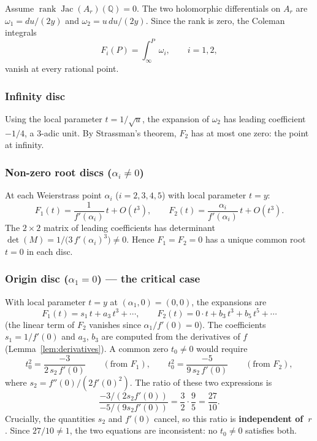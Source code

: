 \documentclass[11pt]{amsart}
\theoremstyle{plain}
\theoremstyle{definition}
\theoremstyle{remark}
\newcommand{\QQ}{\mathbb{Q}}
\newcommand{\Jac}{\operatorname{Jac}}
\newcommand{\rank}{\operatorname{rank}}
\begin{document}
Assume $\rank\Jac(A_r)(\QQ)=0$.  The two holomorphic differentials on $A_r$ are
$\omega_1=du/(2y)$ and $\omega_2=u\,du/(2y)$.
Since the rank is zero, the Coleman integrals
\[
  F_i(P) = \int_{\infty}^{P}\omega_i,\qquad i=1,2,
\]
vanish at every rational point.

\subsubsection*{Infinity disc}
Using the local parameter $t=1/\sqrt{u}$, the expansion of $\omega_2$ has leading
coefficient $-1/4$, a $3$-adic unit.  By Strassman's theorem, $F_2$ has at most
one zero: the point at infinity.

\subsubsection*{Non-zero root discs ($\alpha_i\ne 0$)}
At each Weierstrass point $\alpha_i$ ($i=2,3,4,5$) with local parameter $t=y$:
\[
  F_1(t) = \frac{1}{f'(\alpha_i)}\,t + O(t^3),\qquad
  F_2(t) = \frac{\alpha_i}{f'(\alpha_i)}\,t + O(t^3).
\]
The $2\times 2$ matrix of leading coefficients has determinant
$\det(M)=1/\bigl(3\,f'(\alpha_i)^3\bigr)\ne 0$.
Hence $F_1=F_2=0$ has a unique common root $t=0$ in each disc.

\subsubsection*{Origin disc ($\alpha_1=0$) --- the critical case}
With local parameter $t=y$ at $(\alpha_1,0)=(0,0)$, the expansions are
\[
  F_1(t) = s_1\,t+a_3\,t^3+\cdots,\qquad
  F_2(t) = 0\cdot t+b_3\,t^3+b_5\,t^5+\cdots
\]
(the linear term of $F_2$ vanishes since $\alpha_1/f'(0)=0$).
The coefficients $s_1=1/f'(0)$ and $a_3$, $b_3$ are computed from the
derivatives of $f$ (Lemma~\ref{lem:derivatives}).
A common zero $t_0\ne 0$ would require
\begin{equation}\label{eq:ratio}
  t_0^2 = \frac{-3}{2\,s_2\,f'(0)}\qquad(\text{from }F_1),\qquad
  t_0^2 = \frac{-5}{9\,s_2\,f'(0)}\qquad(\text{from }F_2),
\end{equation}
where $s_2 = f''(0)/(2f'(0)^2)$.
The ratio of these two expressions is
\[
  \frac{-3/(2s_2 f'(0))}{-5/(9s_2 f'(0))} = \frac{3}{2}\cdot\frac{9}{5}
  = \frac{27}{10}.
\]
Crucially, the quantities $s_2$ and $f'(0)$ cancel, so this ratio is
\textbf{independent of~$r$}.  Since $27/10\ne 1$,
the two equations are inconsistent: no $t_0\ne 0$ satisfies both.
\end{document}
